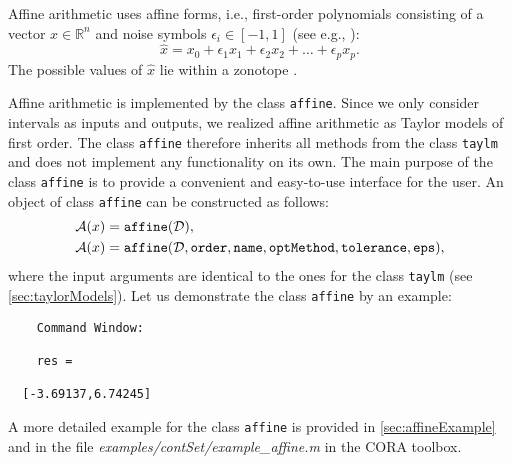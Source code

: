  \label{sec:affine}

Affine arithmetic uses affine forms, i.e., first-order polynomials consisting of a vector $x\in \mathbb{R}^n$ and noise symbols $\epsilon_i \in [-1,1]$ (see e.g., \cite{deFigueiredo2004}):
\begin{equation*}
 \hat{x} = x_0 + \epsilon_1 x_1 + \epsilon_2 x_2 + \ldots + \epsilon_p x_p.
\end{equation*}
The possible values of $\hat{x}$ lie within a zonotope \cite{Kuehn1998b}.

Affine arithmetic is implemented by the class \texttt{affine}. Since we only consider intervals as inputs and outputs, we realized affine arithmetic as Taylor models of first order. The class \texttt{affine} therefore inherits all methods from the class \texttt{taylm} and does not implement any functionality on its own. The main purpose of the class \texttt{affine} is to provide a convenient and easy-to-use interface for the user. An object of class \texttt{affine} can be constructed as follows:
\begin{equation*}
	\begin{split}
		& \mathcal{A}(x) = {\normalfont \texttt{affine}}(\mathcal{D}), \\
		& \mathcal{A}(x) = {\normalfont \texttt{affine}}(\mathcal{D},\texttt{order},\texttt{name},\texttt{optMethod},\texttt{tolerance},\texttt{eps}),
	\end{split}
\end{equation*}
where the input arguments are identical to the ones for the class \texttt{taylm} (see \cref{sec:taylorModels}). Let us demonstrate the class \texttt{affine} by an example:

\begin{center}
\begin{minipage}[t]{0.50\textwidth}
	\vspace{10pt}
	\footnotesize
	
\end{minipage}
\begin{minipage}[t]{0.25\textwidth}
	\vspace{10pt}

	\begin{verbatim}	
	Command Window:
	
	res =

  [-3.69137,6.74245]
	\end{verbatim}
\end{minipage}
\end{center}

A more detailed example for the class \texttt{affine} is provided in \cref{sec:affineExample} and in the file \textit{examples/contSet/example\_affine.m} in the CORA toolbox.